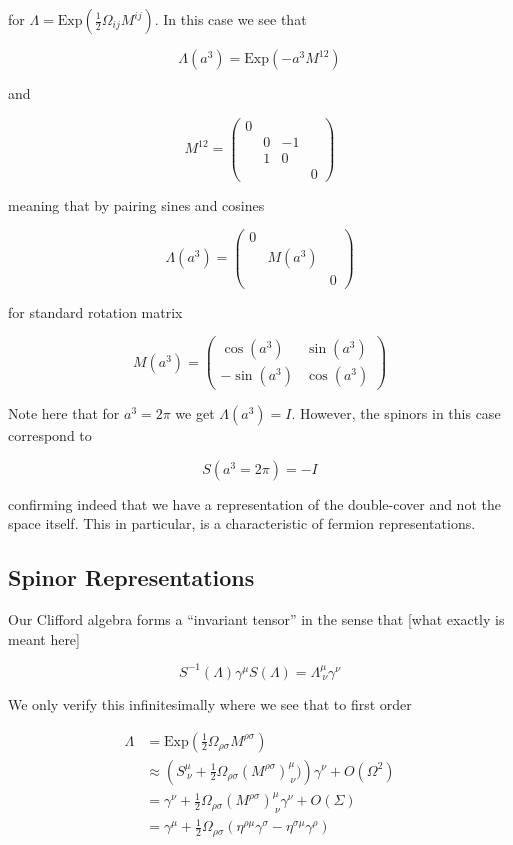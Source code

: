 \documentclass{article}
\theoremstyle{definition}
\begin{document}
for $\Lambda = \text{Exp}(\frac{1}{2} \Omega_{ij} M^{ij})$. In this case we see
that

$$ \Lambda(a^3) = \text{Exp}(-a^3 M^{12}) $$

and

$$ M^{12} =
\begin{pmatrix}
  0 & & & \\
  & 0 & -1 & \\
  & 1 & 0 & \\
  & & & 0
\end{pmatrix} $$

meaning that by pairing sines and cosines

$$ \Lambda(a^3) =
\begin{pmatrix}
  0 && \\
  & M(a^3) & \\
  && 0
\end{pmatrix} $$

for standard rotation matrix

$$ M(a^3) =
\begin{pmatrix}
  \cos(a^3) & \sin(a^3) \\
  -\sin(a^3) & \cos(a^3)
\end{pmatrix} $$

Note here that for $a^3 = 2\pi$ we get $\Lambda(a^3) = I$. However, the spinors
in this case correspond to

$$ S(a^3 = 2\pi) = - I $$

confirming indeed that we have a representation of the double-cover and not the
space itself. This in particular, is a characteristic of fermion
representations. 

\subsection{Spinor Representations}

Our Clifford algebra forms a ``invariant tensor'' in the sense that [what
exactly is meant here]

$$ S^{-1} (\Lambda) \gamma^\mu S(\Lambda) = \Lambda^\mu_{\ \nu} \gamma^\nu $$

We only verify this infinitesimally where we see that to first order

\begin{align*}
  \Lambda &= \text{Exp} \left( \frac{1}{2} \Omega_{\rho \sigma}
            M^{\rho \sigma} \right) \\
          &\approx \left( S^\mu_{\ \nu} + \frac{1}{2} \Omega_{\rho \sigma}
            (M^{\rho \sigma})^\mu_{\ \nu}) \right)
            \gamma^\nu + O(\Omega^2) \\
          &= \gamma^\nu + \frac{1}{2} \Omega_{\rho \sigma}
            (M^{\rho \sigma})^\mu_{\ \nu} \gamma^\nu + O(\Sigma) \\
          &= \gamma^\mu + \frac{1}{2} \Omega_{\rho \sigma} (\eta^{\rho \mu} \gamma^\sigma
            - \eta^{\sigma \mu} \gamma^\rho)
\end{align*}
\end{document}
